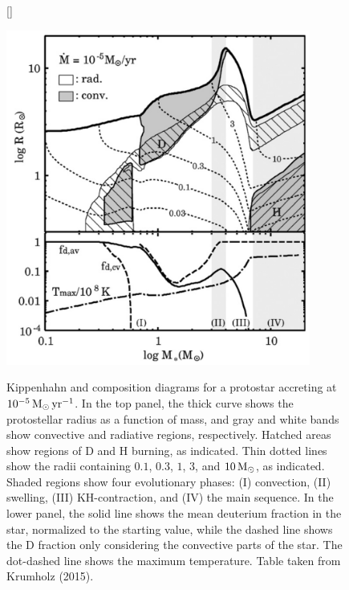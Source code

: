 \documentclass[a4paper,10pt]{article}
\begin{document}
\begin{figure}[h]
    [\FBwidth]
    {\caption{\footnotesize{Kippenhahn and composition diagrams for a protostar accreting at $10^{-5}\,{\rm M_\odot\,yr^{-1}}$. In the top panel, the thick curve shows the protostellar radius as a function of mass, and gray and white bands show convective and radiative regions, respectively. Hatched areas show regions of D and H burning, as indicated. Thin dotted lines show the radii containing $0.1$, $0.3$, $1$, $3$, and $10\,{\rm M_\odot}$, as indicated. Shaded regions show four evolutionary phases: (I) convection, (II) swelling, (III) KH-contraction, and (IV) the main sequence. In the lower panel, the solid line shows the mean deuterium fraction in the star, normalized to the starting value, while the dashed line shows the D fraction only considering the convective parts of the star. The dot-dashed line shows the maximum temperature. Table taken from Krumholz (2015).}}
    \label{fig:RvsMprotostars}}
    {\includegraphics[width=10cm]{figures/RvsM_protostars.png}}
\end{figure}
\end{document}
